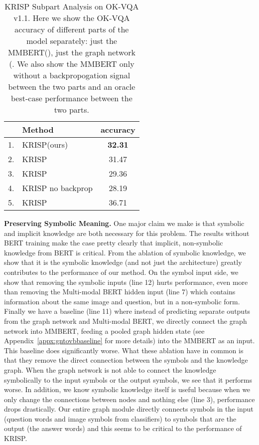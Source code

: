 \documentclass[final]{cvpr}
\providecommand{\ModelName}{KRISP\xspace}
\providecommand{\MMBERTBase}{Multi-modal BERT\xspace}
\providecommand{\MMBERTAbr}{MMBERT\xspace}
\providecommand{\myparagraph}[1]{\noindent\textbf{#1.}}
\providecommand{\sectionvspace}{\vspace{-0cm}}
\begin{document}
\begin{table}[t]
\begin{center}
\begin{tabular}{@{}rlc@{}}
\toprule
&Method &  accuracy\\ 
\hline
1. & \ModelName  (ours) & \bf{32.31} \\
2. & \ModelName  & 31.47 \\
3. & \ModelName  & 29.36 \\
4. & \ModelName no backprop  & 28.19\\
\hline
5. & \ModelName   & 36.71\\
\bottomrule
\end{tabular}
\end{center}
\caption{\ModelName Subpart Analysis on OK-VQA v1.1. Here we show the OK-VQA accuracy of different parts of the model separately: just the \MMBERTAbr (), just the graph network (. We also show the \MMBERTAbr only without a backpropogation signal between the two parts and an oracle best-case performance between the two parts.}
\vspace{-.2cm}
\label{table:GraphAnalysis}
\label{sec:analysis}
\end{table}

\myparagraph{Preserving Symbolic Meaning}
One major claim we make is that symbolic and implicit knowledge are both necessary for this problem. The results without BERT training make the case pretty clearly that implicit, non-symbolic knowledge from BERT is critical. From the ablation of symbolic knowledge, we show that it is the symbolic knowledge (and not just the architecture) greatly contributes to the performance of our method.
On the symbol input side, we show that removing the symbolic inputs (line 12) 
hurts performance, even more than removing the \MMBERTBase hidden input (line 7) which  contains information about the same image and question, but in a non-symbolic form. 
Finally we have a baseline (line 11) where instead of predicting separate outputs from the graph network and \MMBERTBase, we directly connect the graph network into \MMBERTAbr, feeding a pooled graph hidden state (see Appendix~\ref{appx:gntovbbaseline} for more details)
into the \MMBERTAbr 
as an input. This baseline does significantly worse. What these ablation have in common is that they remove the direct connection between the symbols and the knowledge graph. When the graph network is not able to connect the knowledge symbolically to the input symbols or the output symbols, we see that it performs worse. In addition, we know symbolic knowledge itself is useful because when we only change the connections between nodes and nothing else (line 3), performance drops drastically. Our entire graph module directly connects symbols in the input (question words and image symbols from classifiers) to symbols that are the output (the answer words) and this seems to be critical to the performance of \ModelName. 
\sectionvspace
\end{document}
